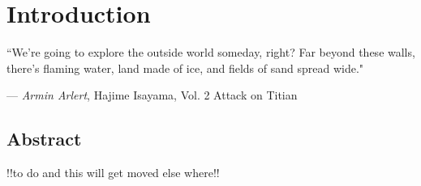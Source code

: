 \documentclass[12pt]{ociamthesis}
\begin{document}
\chapter{Introduction}
\label{chap:intro}
\epigraph{``We're going to explore the outside world someday, right? Far beyond these walls, there's flaming water, land made of ice, and fields of sand spread wide."}{--- \textit{Armin Arlert}, \textup{Hajime Isayama}, Vol. 2  Attack on Titian}
\section{Abstract}
\label{sec:Abstract}
{\color{green} !!to do and this will get moved else where!!}
\end{document}
